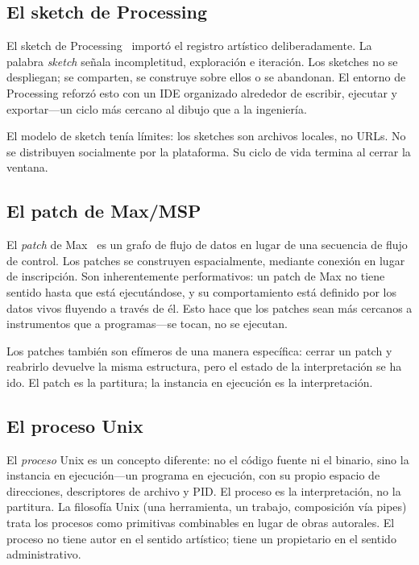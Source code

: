 \documentclass[10pt,letterpaper,twocolumn]{article}
\begin{document}
\subsection{El sketch de Processing}

El sketch de Processing~\citep{reas2007processing} importó el registro artístico deliberadamente. La palabra \emph{sketch} señala incompletitud, exploración e iteración. Los sketches no se despliegan; se comparten, se construye sobre ellos o se abandonan. El entorno de Processing reforzó esto con un IDE organizado alrededor de escribir, ejecutar y exportar---un ciclo más cercano al dibujo que a la ingeniería.

El modelo de sketch tenía límites: los sketches son archivos locales, no URLs. No se distribuyen socialmente por la plataforma. Su ciclo de vida termina al cerrar la ventana.

\subsection{El patch de Max/MSP}

El \emph{patch} de Max~\citep{puckette1988patcher,puckette1996pure} es un grafo de flujo de datos en lugar de una secuencia de flujo de control. Los patches se construyen espacialmente, mediante conexión en lugar de inscripción. Son inherentemente performativos: un patch de Max no tiene sentido hasta que está ejecutándose, y su comportamiento está definido por los datos vivos fluyendo a través de él. Esto hace que los patches sean más cercanos a instrumentos que a programas---se tocan, no se ejecutan.

Los patches también son efímeros de una manera específica: cerrar un patch y reabrirlo devuelve la misma estructura, pero el estado de la interpretación se ha ido. El patch es la partitura; la instancia en ejecución es la interpretación.

\subsection{El proceso Unix}

El \emph{proceso} Unix es un concepto diferente: no el código fuente ni el binario, sino la instancia en ejecución---un programa en ejecución, con su propio espacio de direcciones, descriptores de archivo y PID. El proceso es la interpretación, no la partitura. La filosofía Unix (una herramienta, un trabajo, composición vía pipes) trata los procesos como primitivas combinables en lugar de obras autorales. El proceso no tiene autor en el sentido artístico; tiene un propietario en el sentido administrativo.
\end{document}
